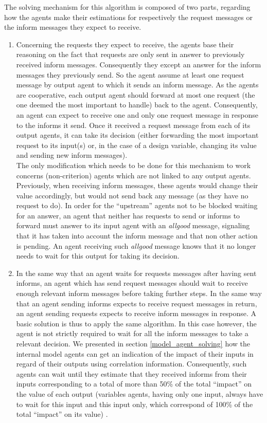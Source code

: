 The solving mechanism for this algorithm is composed of two parts, regarding how the agents make their estimations for respectively the request messages or the inform messages they expect to receive.
\begin{enumerate}
\item Concerning the requests they expect to receive, the agents base their reasoning on the fact that requests are only sent in answer to previously received inform messages. Consequently they except an answer for the inform messages they previously send. So the agent assume at least one request message by output agent to which it sends an inform message. As the agents are cooperative, each output agent should forward at most one request (the one deemed the most important to handle) back to the agent. Consequently, an agent can expect to receive one and only one request message in response to the informs it send. Once it received a request message from each of its output agents, it can take its decision (either forwarding the most important request to its input(s) or, in the case of a design variable, changing its value and sending new inform messages).\\
The only modification which needs to be done for this mechanism to work concerns (non-criterion) agents which are not linked to any output agents. Previously, when receiving inform messages, these agents would change their value accordingly, but would not send back any message (as they have no request to do). In order for the \enquote{upstream} agents not to be blocked waiting for an answer, an agent that neither has requests to send or informs to forward must answer to its input agent with an \emph{allgood} message, signaling that it has taken into account the inform message and that non other action is pending. An agent receiving such \emph{allgood} message knows that it no longer needs to wait for this output for taking its decision.

\item In the same way that an agent waits for requests messages after having sent informs, an agent which has send request messages should wait to receive enough relevant inform messages before taking further steps. In the same way that an agent sending informs expects to receive request messages in return, an agent sending requests expects to receive inform messages in response. A basic solution is thus to apply the same algorithm. In this case however, the agent is not strictly required to wait for all the inform messages to take a relevant decision. We presented in section \ref{model_agent_solving} how the internal model agents can get an indication of the impact of their inputs in regard of their outputs using correlation information. Consequently, such agents can wait until they estimate that they received informs from their inputs corresponding to a total of more than 50\% of the total \enquote{impact} on the value of each output (variables agents, having only one input, always have to wait for this input and this input only, which correspond of 100\% of the total \enquote{impact} on its value) .
\end{enumerate}

